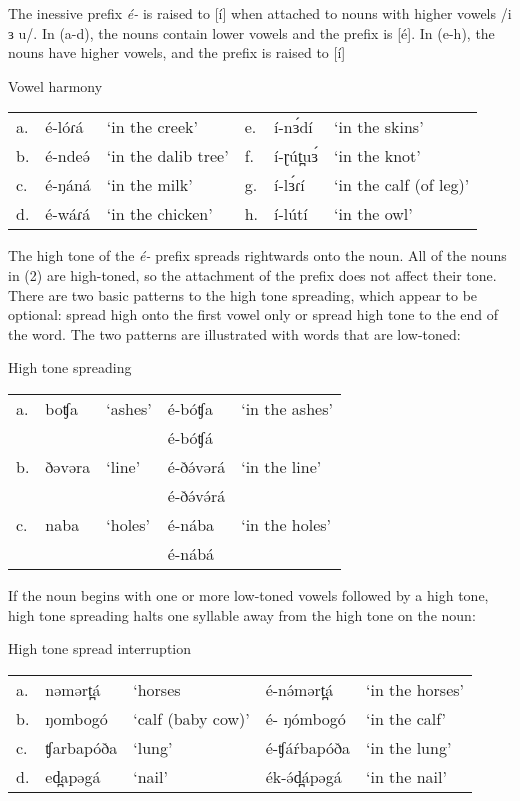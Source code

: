 The inessive prefix \textit{é-} is raised to [í] when attached to nouns with higher vowels /i  ɜ u/. In (a-d), the nouns contain lower vowels and the prefix is [é]. In (e-h), the nouns have higher vowels, and the prefix is raised to [í] 

\ea Vowel harmony
\begin{tabular}{llllll}
a.&	é-lóɾá	&	‘in the creek’		&	e.&	í-nɜ́dí	&‘in the skins’\\
b.&	é-ndeə́	&	‘in the dalib tree’	&	f.&	í-ɽút̪uɜ́	&‘in the knot’\\
c.&	é-ŋáná	&	‘in the milk’		&	g.&	í-lɜ́ɾí	&‘in the calf (of leg)’\\
d.&	é-wáɾá	&	‘in the chicken’		&	h.&	í-lútí	&‘in the owl’\\
\end{tabular}
\z 

The high tone of the \textit{é-} prefix spreads rightwards onto the noun. All of the nouns in (2) are high-toned, so the attachment of the prefix does not affect their tone. There are two basic patterns to the high tone spreading, which appear to be optional: spread high onto the first vowel only or spread high tone to the end of the word. The two patterns are illustrated with words that are low-toned:

\ea High tone spreading	\\
\begin{tabular}[t]{lllll}
a.&	boʧa	&	‘ashes’		&é-bóʧa	&‘in the ashes’\\
 &			&		 	 &	 	é-bóʧá	& \\
b.&	ðəvəra	&	‘line’	 	&é-ðə́vərá	&‘in the line’\\
 &			&		 	 &	 é-ðə́və́rá	& \\
c.&	naba	&	‘holes’		&é-nába	&‘in the holes’\\
 &			&		 	 &	 é-nábá &	\\
\end{tabular}
\z 

If the noun begins with one or more low-toned vowels followed by a high tone, high tone spreading halts one syllable away from the high tone on the noun:

\ea	High tone spread interruption\\
\begin{tabular}[t]{lllll} 
a.&	nəmərt̪á		&	‘horses			&	é-nə́mərt̪á	&	‘in the horses’\\
b.&	ŋombogó		&	‘calf (baby cow)’&	 	é- ŋómbogó	&	‘in the calf’\\
c.&	ʧarbapóða	&	‘lung’			&	é-ʧáŕbapóða	&	‘in the lung’\\
d.&	ed̪apəgá		&	‘nail’			&	ék-ə́d̪ápəgá	&	‘in the nail’\\
\end{tabular}
\z 

